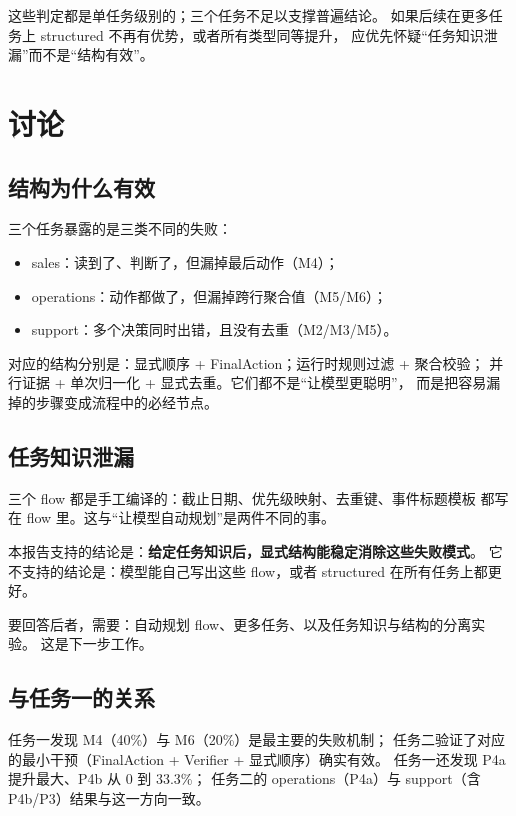 \documentclass[UTF8,a4paper,11pt]{ctexart}
\begin{document}
这些判定都是单任务级别的；三个任务不足以支撑普遍结论。
如果后续在更多任务上 structured 不再有优势，或者所有类型同等提升，
应优先怀疑“任务知识泄漏”而不是“结构有效”。

\section{讨论}
\label{sec:discussion}

\subsection{结构为什么有效}

三个任务暴露的是三类不同的失败：

\begin{itemize}
  \item sales：读到了、判断了，但漏掉最后动作（M4）；
  \item operations：动作都做了，但漏掉跨行聚合值（M5/M6）；
  \item support：多个决策同时出错，且没有去重（M2/M3/M5）。
\end{itemize}

对应的结构分别是：显式顺序 + FinalAction；运行时规则过滤 + 聚合校验；
并行证据 + 单次归一化 + 显式去重。它们都不是“让模型更聪明”，
而是把容易漏掉的步骤变成流程中的必经节点。

\subsection{任务知识泄漏}

三个 flow 都是手工编译的：截止日期、优先级映射、去重键、事件标题模板
都写在 flow 里。这与“让模型自动规划”是两件不同的事。

本报告支持的结论是：\textbf{给定任务知识后，显式结构能稳定消除这些失败模式}。
它不支持的结论是：模型能自己写出这些 flow，或者 structured 在所有任务上都更好。

要回答后者，需要：自动规划 flow、更多任务、以及任务知识与结构的分离实验。
这是下一步工作。

\subsection{与任务一的关系}

任务一发现 M4（40\%）与 M6（20\%）是最主要的失败机制；
任务二验证了对应的最小干预（FinalAction + Verifier + 显式顺序）确实有效。
任务一还发现 P4a 提升最大、P4b 从 0 到 33.3\%；
任务二的 operations（P4a）与 support（含 P4b/P3）结果与这一方向一致。
\end{document}
